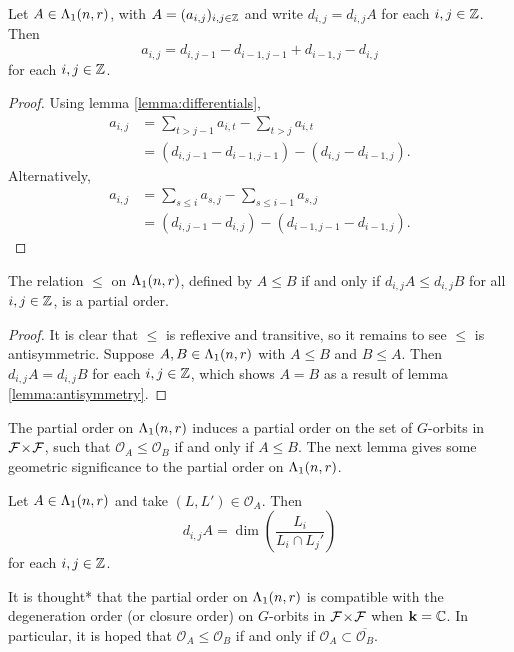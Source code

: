 \documentclass[a4paper, 11pt]{report}
\begin{document}
\begin{lemma}\label{lemma:antisymmetry}
Let $A\in\Lambda_1(n,r)$, with $A = (a_{i,j})_{i,j\in\mathbb{Z}}$ and write $d_{i,j}=d_{i,j}A$ for each $i,j\in\mathbb{Z}$. Then
\begin{equation*}
a_{i,j} = d_{i,j-1} - d_{i-1,j-1} + d_{i-1,j} - d_{i,j}
\end{equation*}
for each $i,j\in\mathbb{Z}$.
\end{lemma}
\begin{proof}
Using lemma \ref{lemma:differentials},
\begin{align*}
a_{i,j}
&= \sum_{t>j-1}a_{i,t} - \sum_{t>j}a_{i,t}\\
&= (d_{i,j-1} - d_{i-1,j-1}) - (d_{i,j} - d_{i-1,j}).
\end{align*}
Alternatively,
\begin{align*}
a_{i,j}
&= \sum_{s\le i}a_{s,j} - \sum_{s\le i-1}a_{s,j}\\
&= (d_{i,j-1} - d_{i,j}) - (d_{i-1,j-1} - d_{i-1,j}).
\end{align*}
\end{proof}

\begin{lemma}\label{lemma:orbit-poset}
The relation $\le$ on $\Lambda_1(n,r)$, defined by $A\le B$ if and only if $d_{i,j}A\le d_{i,j}B$
for all $i,j\in\mathbb{Z}$, is a partial order.
\end{lemma}

\begin{proof}
It is clear that $\le$ is reflexive and transitive, so it remains to see $\le$ is antisymmetric. Suppose $A,B\in\Lambda_1(n,r)$ with $A\le B$ and $B\le A$. Then $d_{i,j}A = d_{i,j}B$ for each $i,j\in\mathbb{Z}$, which shows $A=B$ as a result of lemma \ref{lemma:antisymmetry}.  
\end{proof}

The partial order on $\Lambda_1(n,r)$ induces a partial order on the set of $G$-orbits in ${\mathcal{F}\!\times\!\mathcal{F}}$, such that $\mathcal{O}_A\le \mathcal{O}_B$ if and only if $A\le B$. The next lemma gives some geometric significance to the partial order on $\Lambda_1(n,r)$.

\begin{lemma}
Let $A\in\Lambda_1(n,r)$ and take $(L,L')\in\mathcal{O}_A$. Then
\begin{equation*}
d_{i,j}A = \dim\left(\frac{L_i}{L_i\cap L_j'}\right)
\end{equation*}
for each $i,j\in\mathbb{Z}$.
\end{lemma}

{\color{red}It is thought* that the partial order on $\Lambda_1(n,r)$ is compatible with the degeneration order (or closure order) on $G$-orbits in ${\mathcal{F}\!\times\!\mathcal{F}}$ when $\mathbf{k}=\mathbb{C}$. In particular, it is hoped that $\mathcal{O}_A\le \mathcal{O}_B$ if and only if $\mathcal{O}_A\subset \overline{\mathcal{O}_B}$.}
\end{document}
